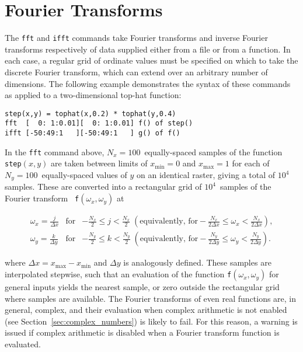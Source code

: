 \section{Fourier Transforms}

The {\tt fft} and {\tt ifft} commands take Fourier
transforms and inverse Fourier transforms respectively of data supplied either
from a file or from a function. In each case, a regular grid of ordinate values
must be specified on which to take the discrete Fourier transform, which can
extend over an arbitrary number of dimensions. The following example
demonstrates the syntax of these commands as applied to a two-dimensional
top-hat function:

\begin{verbatim}
step(x,y) = tophat(x,0.2) * tophat(y,0.4)
fft  [  0: 1:0.01][  0: 1:0.01] f() of step()
ifft [-50:49:1   ][-50:49:1   ] g() of f()
\end{verbatim}

\noindent In the {\tt fft} command above, $N_x=100$~equally-spaced samples of
the function {\tt step}$(x,y)$ are taken between limits of $x_\mathrm{min}=0$
and $x_\mathrm{max}=1$ for each of $N_y=100$~equally-spaced values of $y$ on an
identical raster, giving a total of $10^4$ samples. These are converted into a
rectangular grid of $10^4$~samples of the Fourier transform {\tt
f}$(\omega_x,\omega_y)$ at

\begin{eqnarray}
\omega_x = \frac{j}{\Delta x} & \textrm{for} & -\frac{N_x}{2}\leq j <\frac{N_x}{2} \; \left(\textrm{equivalently, for} -\frac{N_x}{2\Delta x}\leq \omega_x <\frac{N_x}{2\Delta x} \right), \nonumber \\
\omega_y = \frac{k}{\Delta y} & \textrm{for} & -\frac{N_y}{2}\leq k <\frac{N_y}{2} \; \left(\textrm{equivalently, for} -\frac{N_y}{2\Delta y}\leq \omega_y <\frac{N_y}{2\Delta y} \right). \nonumber
\end{eqnarray}

\noindent where $\Delta x=x_\mathrm{max}-x_\mathrm{min}$ and $\Delta y$ is
analogously defined. These samples are interpolated stepwise, such that an
evaluation of the function {\tt f}$(\omega_x,\omega_y)$ for general inputs
yields the nearest sample, or zero outside the rectangular grid where samples
are available. The Fourier transforms of even real functions are, in general,
complex, and their evaluation when complex arithmetic is not enabled (see
Section~\ref{sec:complex_numbers}) is likely to fail. For this reason, a
warning is issued if complex arithmetic is disabled when a Fourier transform
function is evaluated.


